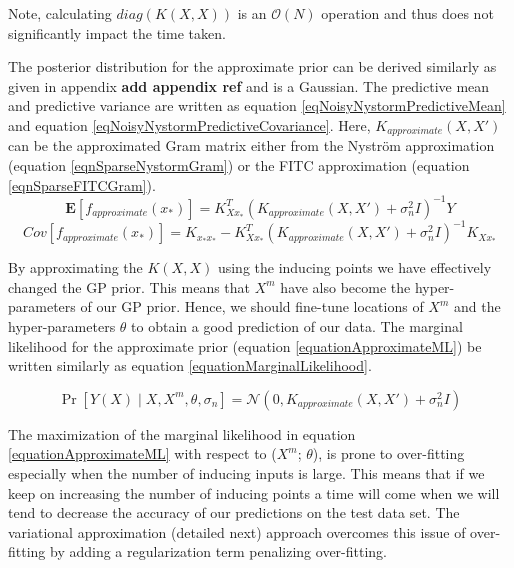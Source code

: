Note, calculating $diag(K(X, X))$ is an $\mathcal{O}\left ( N \right )$ operation and thus does not significantly impact the time taken. 


The posterior distribution for the approximate prior can be derived similarly as given in appendix \textbf{add appendix ref} and is a Gaussian. The predictive mean and predictive variance are written as equation \ref{eqNoisyNystormPredictiveMean} and equation \ref{eqNoisyNystormPredictiveCovariance}. Here, $K_{approximate}(X, X')$ can be the approximated Gram matrix either from the Nystr\"{o}m approximation (equation \ref{eqnSparseNystormGram}) or the FITC approximation (equation \ref{eqnSparseFITCGram}). 
\begin{equation}\label{eqNoisyNystormPredictiveMean}
  \mathbf{E}[f_{approximate}(x_{*})] = K_{Xx_{*}}^{T}( K_{approximate}(X, X') + \sigma^{2}_{n}I)^{-1}Y
  \end{equation}
\begin{equation}\label{eqNoisyNystormPredictiveCovariance}
	Cov[f_{approximate}(x_{*})] = K_{x_{*}x_{*}} - K_{Xx_{*}}^{T}( K_{approximate}(X, X') + \sigma^{2}_{n}I )^{-1} K_{Xx_{*}}
  \end{equation}


By approximating the $K(X, X)$ using the inducing points we have effectively changed the GP prior. This means that $X^{m}$ have also become the hyper-parameters of our GP prior. Hence, we should fine-tune locations of $X^{m}$ and the hyper-parameters $\theta$ to obtain a good prediction of our data. The marginal likelihood for the approximate prior (equation \ref{equationApproximateML}) be written similarly as equation \ref{equationMarginalLikelihood}.

\begin{equation}\label{equationApproximateML}
    \Pr[Y(X) \mid X, X^{m}, \theta, \sigma_{n}] = \mathcal{N}(0 , K_{approximate}(X, X') + \sigma^{2}_{n}I)
\end{equation}


The maximization of the marginal likelihood in equation \ref{equationApproximateML} with respect to ($X^{m}$; $\theta$), is prone to over-fitting especially when the number of inducing inputs is large. This means that if we keep on increasing the number of inducing points a time will come when we will tend to decrease the accuracy of our predictions on the test data set. The variational approximation (detailed next) approach overcomes this issue of over-fitting by adding a regularization term penalizing over-fitting.

